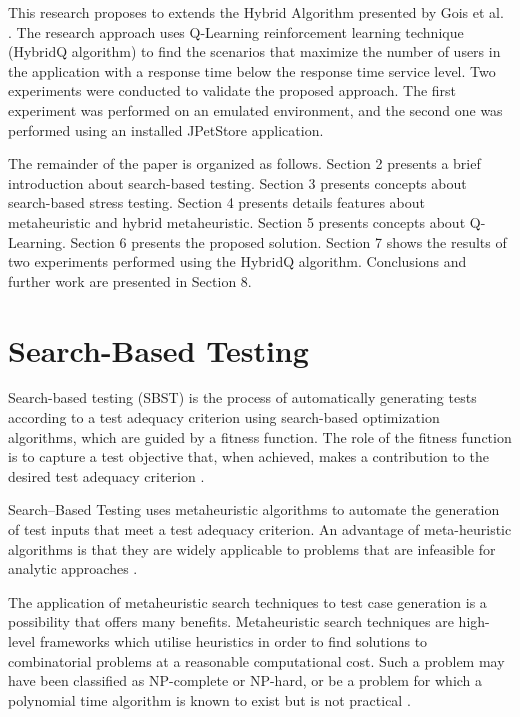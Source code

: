 \documentclass{bmcart}
\begin{document}
This research proposes to extends the Hybrid Algorithm presented by Gois et al. \citep{Gois2016}. The research approach uses Q-Learning reinforcement learning technique (HybridQ algorithm) to find the scenarios that maximize the number of users in the application with a response time below the response time service level.  Two experiments were conducted to validate the proposed approach. The first experiment was performed on an emulated environment, and the second one was performed using an installed JPetStore application.

The remainder of the paper is organized as follows. Section 2 presents a brief introduction about search-based testing. Section 3 presents concepts about  search-based stress testing. Section 4 presents details features about metaheuristic and hybrid metaheuristic. Section 5 presents concepts about Q-Learning. Section 6 presents the proposed solution. Section 7 shows the results of two experiments performed using the HybridQ algorithm.  Conclusions and further work are presented in Section 8.


\section{Search-Based Testing}

Search-based testing (SBST) is the process of automatically
generating tests according to a test adequacy criterion using search-based optimization algorithms, which are guided by a fitness function. The role of the fitness function is to capture a test objective that, when achieved, makes a contribution to the desired test adequacy criterion \citep{Harman2010}. 

Search–Based Testing uses metaheuristic algorithms to
automate the generation of test inputs that meet a test
adequacy criterion. An advantage of meta-heuristic algorithms is that they are widely applicable to problems that are infeasible for analytic approaches \citep{Baars2011} \citep{Alba2008}. 

The application of metaheuristic search techniques to test case generation is  a possibility that offers many benefits. Metaheuristic search techniques are high-level frameworks which utilise heuristics in order to find solutions to combinatorial problems at a reasonable computational cost. Such a problem may have been classified as NP-complete or NP-hard, or be a problem for which a polynomial time algorithm is known to exist but is not practical \citep{McMinn2004}.
\end{document}
